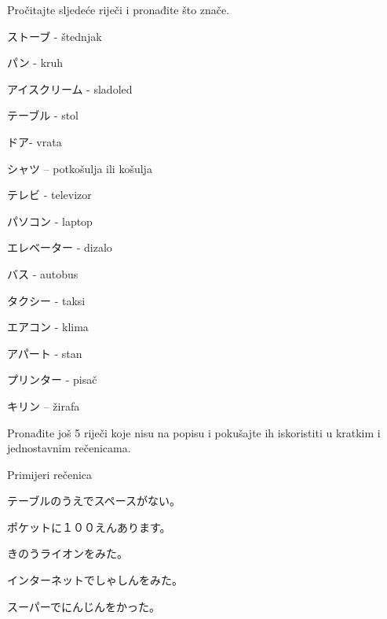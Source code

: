 
\author{Katja Kržišnik}

	
	\begin{mondai}{Pročitajte sljedeće riječi i pronađite što znače.}
		\item ストーブ  - štednjak
		\item パン - kruh
		\item アイスクリーム - sladoled
		\item テーブル - stol
		\item ドア- vrata
		\item シャツ – potkošulja ili košulja
		\item テレビ - televizor
		\item パソコン - laptop
		\item エレベーター - dizalo
		\item バス - autobus
		\item タクシー - taksi
		\item エアコン - klima
		\item アパート - stan
		\item プリンター - pisač
		\item キリン – žirafa
		
	\end{mondai}
	
	Pronađite još 5 riječi koje nisu na popisu i pokušajte ih iskoristiti u kratkim i jednostavnim rečenicama.
	
	\begin{mondai}{Primijeri rečenica}
		\item テーブルのうえでスペースがない。
		\item ポケットに１００えんあります。
		\item きのうライオンをみた。
		\item インターネットでしゃしんをみた。
		\item スーパーでにんじんをかった。
	\end{mondai}
		
